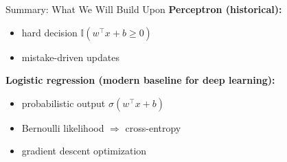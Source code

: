 \documentclass[aspectratio=169]{beamer}
\begin{document}
%
%
\begin{frame}{Summary: What We Will Build Upon}
\textbf{Perceptron (historical):}
\begin{itemize}
  \item hard decision $\mathbb{I}(w^\top x+b\ge 0)$
  \item mistake-driven updates
\end{itemize}

\medskip
\textbf{Logistic regression (modern baseline for deep learning):}
\begin{itemize}
  \item probabilistic output $\sigma(w^\top x+b)$
  \item Bernoulli likelihood $\Rightarrow$ cross-entropy
  \item gradient descent optimization
\end{itemize}

\end{frame}
%
\end{document}

